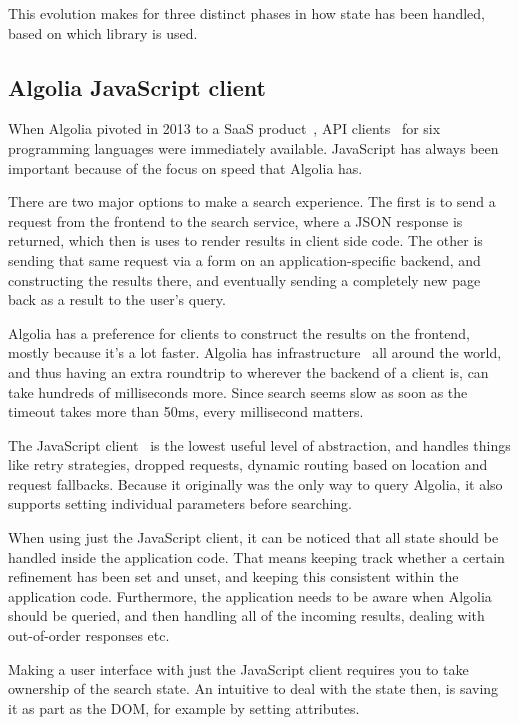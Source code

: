This evolution makes for three distinct phases in how state has been handled, based on which library is used.

\subsection{Algolia JavaScript client} %
\label{sub:algolia_js_client}

When Algolia pivoted in 2013 to a SaaS product~\cite{algolia-blog-saas}, API clients~\cite{algolia-blog-lauch} for six programming languages were immediately available. JavaScript has always been important because of the focus on speed that Algolia has.

There are two major options to make a search experience. The first is to send a request from the frontend to the search service, where a JSON response is returned, which then is uses to render results in client side code. The other is sending that same request via a form on an application-specific backend, and constructing the results there, and eventually sending a completely new page back as a result to the user's query.

Algolia has a preference for clients to construct the results on the frontend, mostly because it's a lot faster. Algolia has infrastructure~\cite{algolia-infra} all around the world, and thus having an extra roundtrip to wherever the backend of a client is, can take hundreds of milliseconds more. Since search seems slow as soon as the timeout takes more than 50ms, every millisecond matters.

The JavaScript client~\cite{algolia-js-client} is the lowest useful level of abstraction, and handles things like retry strategies, dropped requests, dynamic routing based on location and request fallbacks. Because it originally was the only way to query Algolia, it also supports setting individual parameters before searching.

When using just the JavaScript client, it can be noticed that all state should be handled inside the application code. That means keeping track whether a certain refinement has been set and unset, and keeping this consistent within the application code. Furthermore, the application needs to be aware when Algolia should be queried, and then handling all of the incoming results, dealing with out-of-order responses etc.

Making a user interface with just the JavaScript client requires you to take ownership of the search state. An intuitive to deal with the state then, is saving it as part as the DOM, for example by setting attributes.

